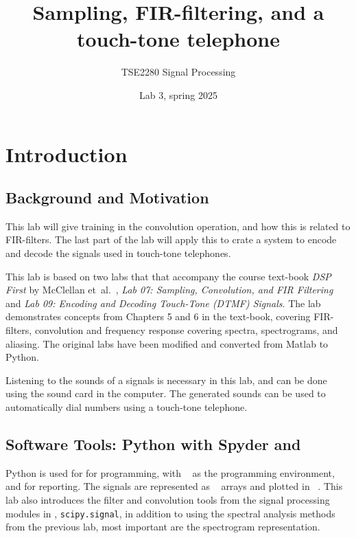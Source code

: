 
\setcounter{secnumdepth}{3}


\logo

\title{Sampling, FIR-filtering, and a touch-tone telephone} 
\author{TSE2280 Signal Processing}
\date{Lab 3, spring 2025}
\maketitle

\thispagestyle{fancy}	

\section{Introduction}
\suppressfloats[t]
\subsection{Background and Motivation}
This lab will give training in the convolution operation, and how this is related to FIR-filters. 
The last part of the lab will apply this to crate a system to encode and decode the signals used in touch-tone telephones.

This lab is based on two labs that that accompany the course text-book \emph{DSP First} by McClellan et~al.~\cite{mcclellan_dsp_2016},  \emph{Lab 07: Sampling, Convolution, and FIR Filtering} and \emph{Lab 09: Encoding and Decoding Touch-Tone (DTMF) Signals}\cite{mcclellan_lab_2016}. 
The lab demonstrates concepts from Chapters 5 and 6 in the text-book, covering FIR-filters, convolution and frequency response covering spectra, spectrograms, and aliasing.
The original labs have been modified and converted from Matlab to Python. 

Listening to the sounds of a signals is necessary in this lab, and can be done using the sound card in the computer. The generated sounds can be used to automatically dial numbers using a touch-tone telephone.



\subsection{Software Tools: Python with Spyder and \jupyterlab}
Python is used for for programming, with \spyder~\cite{raybaut_spyder_2024} as the programming environment, and \jupyterlab \cite{project_jupyter_jupyter_nodate} for reporting.
The signals are represented as 
\numpy~\cite{numpy_numpy_nodate} arrays and plotted in \matplotlib~\cite{matplotlib_matplotlib_nodate}.
This lab also introduces the filter and convolution tools from the signal processing modules in \scipy \cite{scipy_scipy_nodate}, \texttt{scipy.signal}, in addition to using the spectral analysis methods from the previous lab, most important are the spectrogram representation. 


